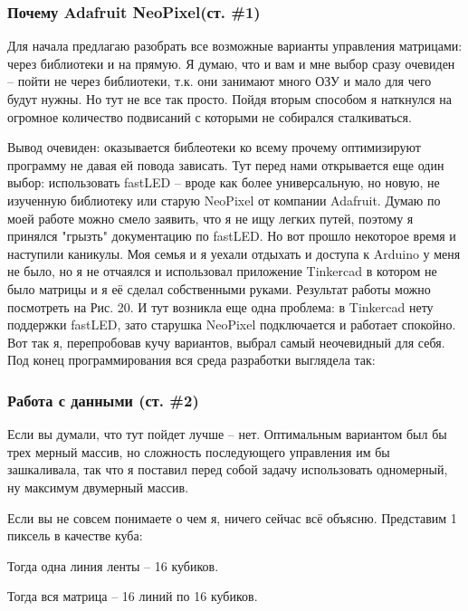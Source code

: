 \documentclass[a4paper, 12pt]{article}
\begin{document}
\subsubsection{Почему  Adafruit NeoPixel(ст. \#1)}

Для начала предлагаю разобрать все возможные варианты управления матрицами:
через библиотеки и на прямую. Я думаю, что и вам и мне выбор сразу очевиден --
пойти не через библиотеки, т.к. они занимают много ОЗУ и мало для чего будут
нужны. Но тут не все так просто. Пойдя вторым способом я наткнулся на огромное
количество подвисаний с которыми не собирался сталкиваться.

Вывод очевиден: оказывается библеотеки ко всему прочему оптимизируют программу 
не давая ей повода зависать. Тут перед нами открывается еще один выбор: 
использовать fastLED -- вроде как более универсальную, но новую, не изученную
библиотеку или старую NeoPixel от компании Adafruit. Думаю по моей работе можно
смело заявить, что я не ищу легких путей, поэтому я принялся "грызть" 
документацию по fastLED. Но вот прошло некоторое время и наступили каникулы. 
Моя семья и я уехали отдыхать и доступа к Arduino у меня не было, но я не 
отчаялся и использовал приложение Tinkercad в котором не было матрицы и я её
сделал собственными руками. Результат работы можно посмотреть на Рис. 20.
И тут возникла еще одна проблема: в Tinkercad нету поддержки fastLED, зато
старушка NeoPixel подключается и работает спокойно. Вот так я, перепробовав
кучу вариантов, выбрал самый неочевидный для себя. Под конец программирования 
вся среда разработки выглядела так:

\newpage
\subsubsection{Работа с данными (ст. \#2)}

Если вы думали, что тут пойдет лучше -- нет. Оптимальным вариантом был бы 
трех мерный массив, но сложность последующего управления им бы зашкаливала,
так что я поставил перед собой задачу использовать одномерный, ну максимум 
двумерный массив.

Если вы не совсем понимаете о чем я, ничего сейчас всё объясню. Представим 1
пиксель в качестве куба:


Тогда одна линия ленты -- 16 кубиков.


Тогда вся матрица -- 16 линий по 16 кубиков.
\end{document}
